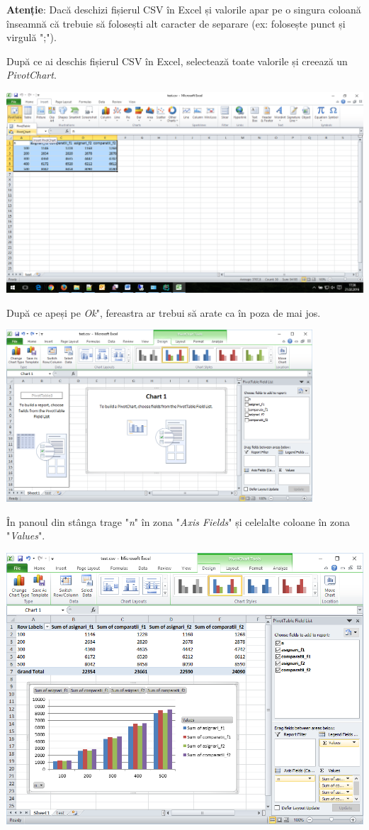 \documentclass[../ro-fa-lab.tex]{subfiles}
\begin{document}
\textbf{Atenție}: Dacă deschizi fișierul CSV în Excel și valorile apar
pe o singura coloană înseamnă că trebuie să folosești alt caracter de
separare (ex: folosește punct și virgulă ";").

După ce ai deschis fișierul CSV în Excel, selectează toate valorile și
creează un \emph{PivotChart}.

\includegraphics[width=\textwidth]{../Resources/lab0/image11.png}

După ce apeși pe \emph{Ok}", fereastra ar trebui să arate ca în poza de
mai jos.

\includegraphics[width=4.5019in,height=2.5319in]{../Resources/lab0/image12.png}

În panoul din stânga trage "\emph{n}" în zona "\emph{Axis Fields}" și
celelalte coloane în zona "\emph{Values}".

\includegraphics[width=\textwidth]{../Resources/lab0/image13.png}
\end{document}
